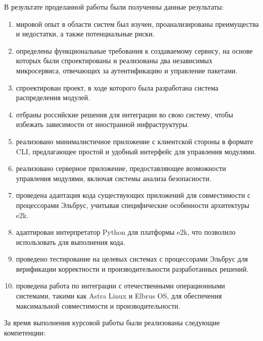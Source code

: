 \Conclusion %

В результате проделанной работы были полученны данные результаты:

\begin{enumerate}
    \item мировой опыт в области систем был изучен, проанализированы преимущества и недостатки, а также потенциальные риски.
    \item определены функциональные требования к создаваемому сервису, на основе которых были спроектированы и реализованы два независимых микросервиса, отвечающих за аутентификацию и управление пакетами.
    \item спроектирован проект, в ходе которого была разработана система распределения модулей.
    \item отбраны российские решения для интеграции во свою систему, чтобы избежать зависимости от иностранной инфраструктуры.
    \item реализовано минималистичное приложение с клиентской стороны в формате CLI, предлагающее простой и удобный интерфейс для управления модулями.
    \item реализовано серверное приложение, предоставляющее возможности управления модулями, включая системы анализа безопасности.
    \item проведена адаптация кода существующих приложений для совместимости с процессорами Эльбрус, учитывая специфические особенности архитектуры e2k.
    \item адаптирован интерпретатор Python для платформы e2k, что позволило использовать для выполнения кода.
    \item проведено тестирование на целевых системах с процессорами Эльбрус для верификации корректности и производительности разработанных решений.
    \item проведена работа по интеграции с отечественными операционными системами, такими как Astra Linux и Elbrus OS, для обеспечения максимальной совместимости и производительности.
\end{enumerate}

\newpage

За время выполнения курсовой работы были реализованы следующие компетенции:

